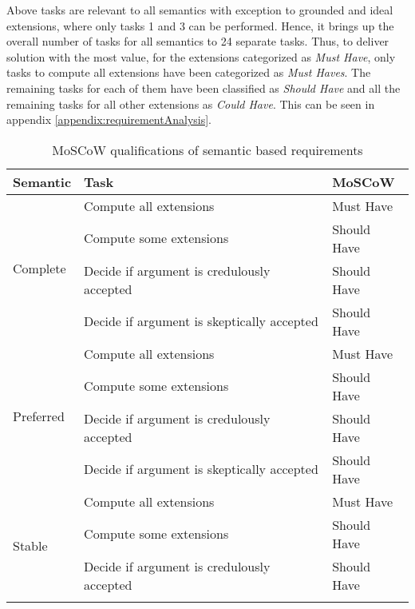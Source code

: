 Above tasks are relevant to all semantics with exception to grounded and ideal extensions, where only tasks 1 and 3 can be performed. Hence, it brings up the overall number of tasks for all semantics to 24 separate tasks. Thus, to deliver solution with the most value, for the extensions categorized as \textit{Must Have}, only tasks to compute all extensions have been categorized as \textit{Must Haves}. The remaining tasks for each of them have been classified as \textit{Should Have} and all the remaining tasks for all other extensions as \textit{Could Have}. This can be seen in appendix \ref{appendix:requirementAnalysis}.

\begin{table}[]
	\centering
	\caption{MoSCoW qualifications of semantic based requirements}
	\label{table:moscowSemanticRequirements}
	\begin{tabular}{|l|l|l|}
		\hline
		\textbf{Semantic}            & \textbf{Task}                                   & \textbf{MoSCoW} \\ \hline \hline
		\multirow{4}{*}{Complete}    & Compute all extensions                           & Must Have       \\ \cline{2-3} 
		& Compute some extensions                          & Should Have     \\ \cline{2-3} 
		& Decide if argument is credulously accepted & Should Have     \\ \cline{2-3} 
		& Decide if argument is skeptically accepted & Should Have     \\ \hline
		\multirow{4}{*}{Preferred}   & Compute all extensions                           & Must Have       \\ \cline{2-3} 
		& Compute some extensions                          & Should Have     \\ \cline{2-3} 
		& Decide if argument is credulously accepted & Should Have     \\ \cline{2-3} 
		& Decide if argument is skeptically accepted & Should Have     \\ \hline
		\multirow{4}{*}{Stable}      & Compute all extensions                           & Must Have       \\ \cline{2-3} 
		& Compute some extensions                          & Should Have     \\ \cline{2-3} 
		& Decide if argument is credulously accepted & Should Have     \\ \cline{2-3} 

\end{tabular}
\end{table}
